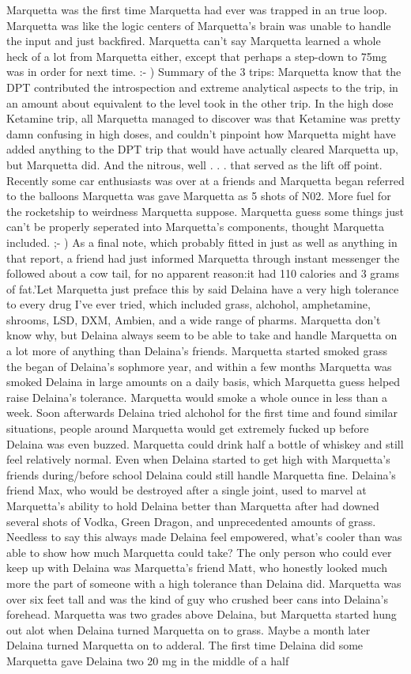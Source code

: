 \documentclass[12pt]{book}
\begin{document}
Marquetta was the first time Marquetta had ever was trapped in an true loop. Marquetta was like the logic centers of Marquetta's brain was unable to handle the input and just backfired. Marquetta can't say Marquetta learned a whole heck of a lot from Marquetta either, except that perhaps a step-down to 75mg was in order for next time. :- ) Summary of the 3 trips: Marquetta know that the DPT contributed the introspection and extreme analytical aspects to the trip, in an amount about equivalent to the level took in the other trip. In the high dose Ketamine trip, all Marquetta managed to discover was that Ketamine was pretty damn confusing in high doses, and couldn't pinpoint how Marquetta might have added anything to the DPT trip that would have actually cleared Marquetta up, but Marquetta did. And the nitrous, well . . .  that served as the lift off point. Recently some car enthusiasts was over at a friends and Marquetta began referred to the balloons Marquetta was gave Marquetta as 5 shots of N02. More fuel for the rocketship to weirdness Marquetta suppose. Marquetta guess some things just can't be properly seperated into Marquetta's components, thought Marquetta included. ;- ) As a final note, which probably fitted in just as well as anything in that report, a friend had just informed Marquetta through instant messenger the followed about a cow tail, for no apparent reason:it had 110 calories and 3 grams of fat.'Let Marquetta just preface this by said Delaina have a very high tolerance to every drug I've ever tried, which included grass, alchohol, amphetamine, shrooms, LSD, DXM, Ambien, and a wide range of pharms. Marquetta don't know why, but Delaina always seem to be able to take and handle Marquetta on a lot more of anything than Delaina's friends. Marquetta started smoked grass the began of Delaina's sophmore year, and within a few months Marquetta was smoked Delaina in large amounts on a daily basis, which Marquetta guess helped raise Delaina's tolerance. Marquetta would smoke a whole ounce in less than a week. Soon afterwards Delaina tried alchohol for the first time and found similar situations, people around Marquetta would get extremely fucked up before Delaina was even buzzed. Marquetta could drink half a bottle of whiskey and still feel relatively normal. Even when Delaina started to get high with Marquetta's friends during/before school Delaina could still handle Marquetta fine. Delaina's friend Max, who would be destroyed after a single joint, used to marvel at Marquetta's ability to hold Delaina better than Marquetta after had downed several shots of Vodka, Green Dragon, and unprecedented amounts of grass. Needless to say this always made Delaina feel empowered, what's cooler than was able to show how much Marquetta could take? The only person who could ever keep up with Delaina was Marquetta's friend Matt, who honestly looked much more the part of someone with a high tolerance than Delaina did. Marquetta was over six feet tall and was the kind of guy who crushed beer cans into Delaina's forehead. Marquetta was two grades above Delaina, but Marquetta started hung out alot when Delaina turned Marquetta on to grass. Maybe a month later Delaina turned Marquetta on to adderal. The first time Delaina did some Marquetta gave Delaina two 20 mg in the middle of a half 
\end{document}
